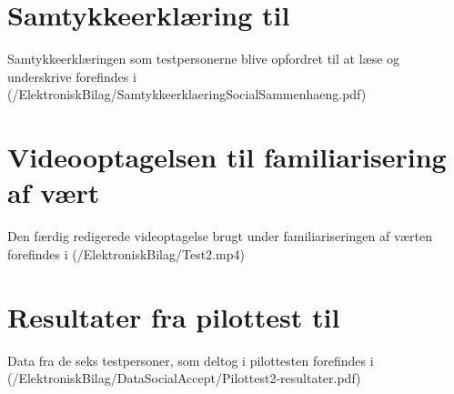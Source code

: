 \section{Samtykkeerklæring til }
\label{app:SamtykkeerklaeringSocialAccept}
%
Samtykkeerklæringen som testpersonerne blive opfordret til at læse og underskrive forefindes i (/ElektroniskBilag/SamtykkeerklaeringSocialSammenhaeng.pdf)
%
\section{Videooptagelsen til familiarisering af vært}
\label{app:VideooptagelseSocialAccept}
%
Den færdig redigerede videoptagelse brugt under familiariseringen af værten forefindes i (/ElektroniskBilag/Test2.mp4)
%
\section{Resultater fra pilottest til }
\label{app:ResultaterPilottestSocialAccept}
%
Data fra de seks testpersoner, som deltog i pilottesten forefindes i \\
(/ElektroniskBilag/DataSocialAccept/Pilottest2-resultater.pdf)
%
